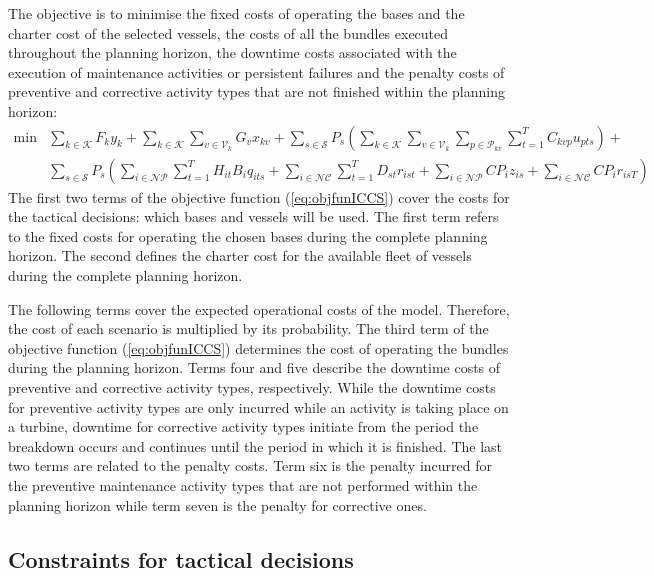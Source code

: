The objective is to minimise the fixed costs of operating the bases and the charter cost of the selected vessels, the costs of all the bundles executed throughout the planning horizon, the downtime costs associated with the execution of maintenance activities or persistent failures and the penalty costs of preventive and corrective activity types that are not finished within the planning horizon:
%
\begin{align}
\label{eq:objfunICCS}
 \min & 	\sum\limits_{k\in \mathcal{K}} F_k y_k  %
	      + \sum\limits_{k\in \mathcal{K}}\sum\limits_{v\in\mathcal{V}_k} G_v x_{kv} %
	      + \sum\limits_{s\in\mathcal{S}} P_{s} \left(\sum\limits_{k\in\mathcal{K}} \sum\limits_{v\in\mathcal{V}_k} \sum\limits_{p\in\mathcal{P}_{kv}} \sum\limits_{t=1}^T C_{kvp}u_{pts}\right) +\\ \nonumber
	    & \sum\limits_{s\in\mathcal{S}} P_{s} \left(\sum\limits_{i\in \mathcal{NP}}  \sum\limits_{t=1}^TH_{i t}B_{i}q_{its}
+ \sum\limits_{i \in\mathcal{NC}} \sum\limits_{t=1}^T D_{st} r_{i st} +  \sum\limits_{i \in\mathcal{NP}} CP_i z_{i s} + \sum\limits_{i \in\mathcal{NC}} CP_i r_{isT}\right)%
\end{align}
%
The first two terms of the objective function (\ref{eq:objfunICCS}) cover the costs for the tactical decisions: which bases and vessels will be used. The first term refers to the fixed costs for operating the chosen bases during the complete planning horizon. The second defines the charter cost for the available fleet of vessels during the complete planning horizon.

The following terms cover the expected operational costs of the model. Therefore, the cost of each scenario is  multiplied by its probability. The third term of the objective function (\ref{eq:objfunICCS}) determines the cost of operating the bundles during the planning horizon. Terms four and five describe the downtime costs of preventive and corrective activity types, respectively. While the downtime costs for preventive activity types are only incurred while an activity is taking place on a turbine, downtime for corrective activity types initiate from the period the breakdown occurs and continues until the period in which it is finished. The last two terms are related to the penalty costs. Term six is the penalty incurred for the preventive maintenance activity types that are not performed within the planning horizon while term seven is the penalty for corrective ones.



\subsection{Constraints for tactical decisions}

